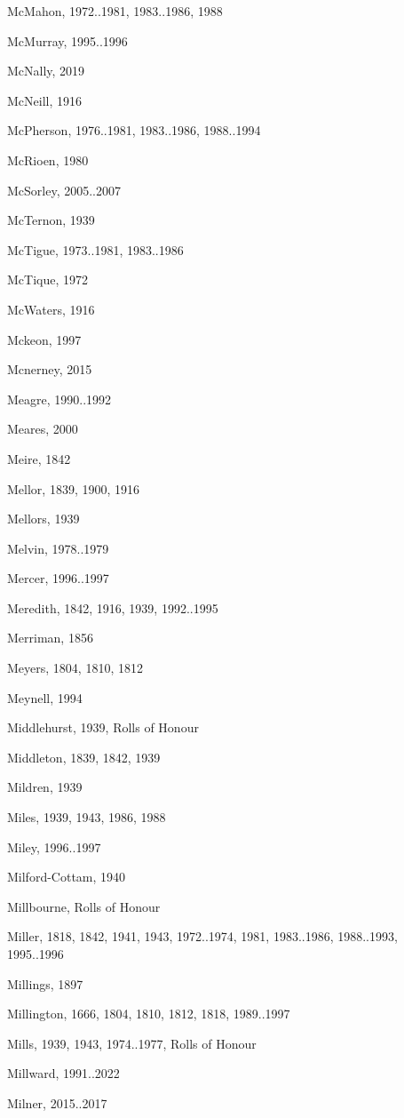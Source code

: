 {\begin{theindex}
\item McMahon, 1972..1981, 1983..1986, 1988
\item McMurray, 1995..1996
\item McNally, 2019
\item McNeill, 1916
\item McPherson, 1976..1981, 1983..1986, 1988..1994
\item McRioen, 1980
\item McSorley, 2005..2007
\item McTernon, 1939
\item McTigue, 1973..1981, 1983..1986
\item McTique, 1972
\item McWaters, 1916
\item Mckeon, 1997
\item Mcnerney, 2015
\item Meagre, 1990..1992
\item Meares, 2000
\item Meire, 1842
\item Mellor, 1839, 1900, 1916
\item Mellors, 1939
\item Melvin, 1978..1979
\item Mercer, 1996..1997
\item Meredith, 1842, 1916, 1939, 1992..1995
\item Merriman, 1856
\item Meyers, 1804, 1810, 1812
\item Meynell, 1994
\item Middlehurst, 1939, Rolls of Honour
\item Middleton, 1839, 1842, 1939
\item Mildren, 1939
\item Miles, 1939, 1943, 1986, 1988
\item Miley, 1996..1997
\item Milford-Cottam, 1940
\item Millbourne, Rolls of Honour
\item Miller, 1818, 1842, 1941, 1943, 1972..1974, 1981, 1983..1986, 1988..1993, 1995..1996
\item Millings, 1897
\item Millington, 1666, 1804, 1810, 1812, 1818, 1989..1997
\item Mills, 1939, 1943, 1974..1977, Rolls of Honour
\item Millward, 1991..2022
\item Milner, 2015..2017

\end{theindex}}

